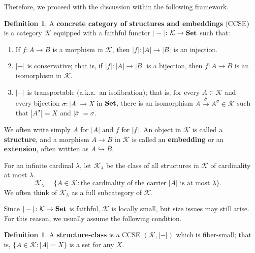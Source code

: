 \documentclass[10pt]{amsart}
\numberwithin{equation}{section}
\theoremstyle{plain}
\theoremstyle{definition}
\newtheorem{definition}[theorem]{Definition}
\newcommand{\K}{\mathcal{K}}
\newcommand{\embed}{\hookrightarrow}
\newcommand{\edge}[1]{\overset{#1}{\longrightarrow}}
\begin{document}
Therefore, we proceed with the discussion within the following framework.




\begin{definition}
A {\bf concrete category of structures and embeddings} (CCSE) is a category $\K$ equipped with a faithful functor $|-|\colon\K\to{\bf Set}$ such that:
\begin{enumerate}
\item If $f\colon A\to B$ is a morphism in $\K$, then $|f|\colon |A|\to |B|$ is an injection.
\item $|-|$ is conservative; that is, if $|f|\colon|A|\to|B|$ is a bijection, then $f\colon A\to B$ is an isomorphism in $\K$.
\item $|-|$ is transportable (a.k.a.~an isofibration); that is, for every $A\in\K$ and every bijection $\sigma\colon |A|\to X$ in ${\bf Set}$, there is an isomorphism $A\edge{\bar{\sigma}}A^\sigma\in\K$ such that $|A^\sigma|=X$ and $|\bar{\sigma}|=\sigma$.
\end{enumerate}

We often write simply $A$ for $|A|$ and $f$ for $|f|$.
An object in $\K$ is called a {\bf structure}, and a morphism $A\to B$ in $\K$ is called an {\bf embedding} or an {\bf extension}, often written as $A\embed B$.
\end{definition}




For an infinite cardinal $\lambda$, let $\K_\lambda$ be the class of all structures in $\K$ of cardinality at most $\lambda$.
\[
\K_\lambda=\{A\in\K:\mbox{the cardinality of the carrier $|A|$ is at most $\lambda$}\}.
\]
We often think of $\K_\lambda$ as a full subcategory of $\K$.

Since $|-|\colon\K\to{\bf Set}$ is faithful, $\K$ is locally small, but size issues may still arise.
For this reason, we usually assume the following condition.

\begin{definition}
A {\bf structure-class} is a CCSE $(\K,|-|)$ which is fiber-small; that is, $\{A\in\K:|A|=X\}$ is a set for any $X$.
\end{definition}
\end{document}
